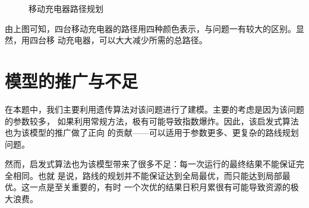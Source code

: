 \documentclass{ctexart}
\begin{document}
\begin{figure}[H]
        
        \centering
        \caption{移动充电器路径规划}
    \end{figure}
    由上图可知，四台移动充电器的路径用四种颜色表示，与问题一有较大的区别。显然，用四台移
    动充电器，可以大大减少所需的总路径。

    \section{模型的推广与不足}
    在本题中，我们主要利用遗传算法对该问题进行了建模。主要的考虑是因为该问题的参数较多，
    如果利用常规方法，极有可能导致指数爆炸。因此，该启发式算法也为该模型的推广做了正向
    的贡献——可以适用于参数更多、更复杂的路线规划问题。

    然而，启发式算法也为该模型带来了很多不足：每一次运行的最终结果不能保证完全相同。也就
    是说，路线的规划并不能保证达到全局最优，而只能达到局部最优。这一点是至关重要的，有时
    一个次优的结果日积月累很有可能导致资源的极大浪费。
\end{document}
